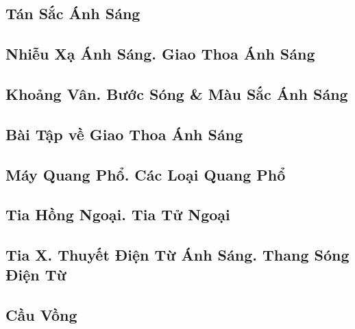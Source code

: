 \documentclass{article}
\numberwithin{equation}{section}
\begin{document}
\subsection{Tán Sắc Ánh Sáng}


\subsection{Nhiễu Xạ Ánh Sáng. Giao Thoa Ánh Sáng}


\subsection{Khoảng Vân. Bước Sóng \& Màu Sắc Ánh Sáng}


\subsection{Bài Tập về Giao Thoa Ánh Sáng}


\subsection{Máy Quang Phổ. Các Loại Quang Phổ}


\subsection{Tia Hồng Ngoại. Tia Tử Ngoại}


\subsection{Tia X. Thuyết Điện Từ Ánh Sáng. Thang Sóng Điện Từ}


\subsection{Cầu Vồng}
\end{document}

